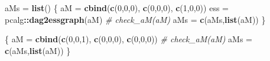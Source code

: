 \documentclass[]{article}
\newenvironment{Shaded}{\begin{snugshade}}{\end{snugshade}}
\newcommand{\KeywordTok}[1]{\textcolor[rgb]{0.13,0.29,0.53}{\textbf{#1}}}
\newcommand{\DecValTok}[1]{\textcolor[rgb]{0.00,0.00,0.81}{#1}}
\newcommand{\StringTok}[1]{\textcolor[rgb]{0.31,0.60,0.02}{#1}}
\newcommand{\CommentTok}[1]{\textcolor[rgb]{0.56,0.35,0.01}{\textit{#1}}}
\newcommand{\OperatorTok}[1]{\textcolor[rgb]{0.81,0.36,0.00}{\textbf{#1}}}
\newcommand{\NormalTok}[1]{#1}
\theoremstyle{definition}
\theoremstyle{definition}
\theoremstyle{definition}
\theoremstyle{remark}
\begin{document}
\begin{Shaded}
\begin{Highlighting}[]
\NormalTok{aMs =}\StringTok{ }\KeywordTok{list}\NormalTok{()}
\NormalTok{\{}
\NormalTok{  aM =}\StringTok{ }\KeywordTok{cbind}\NormalTok{(}\KeywordTok{c}\NormalTok{(}\DecValTok{0}\NormalTok{,}\DecValTok{0}\NormalTok{,}\DecValTok{0}\NormalTok{),}
             \KeywordTok{c}\NormalTok{(}\DecValTok{0}\NormalTok{,}\DecValTok{0}\NormalTok{,}\DecValTok{0}\NormalTok{),}
             \KeywordTok{c}\NormalTok{(}\DecValTok{1}\NormalTok{,}\DecValTok{0}\NormalTok{,}\DecValTok{0}\NormalTok{))}
\NormalTok{  ess =}\StringTok{ }\NormalTok{pcalg}\OperatorTok{::}\KeywordTok{dag2essgraph}\NormalTok{(aM)}
  \CommentTok{# check_aM(aM)}
\NormalTok{  aMs =}\StringTok{ }\KeywordTok{c}\NormalTok{(aMs,}\KeywordTok{list}\NormalTok{(aM))}
\NormalTok{\}}

\NormalTok{\{}
\NormalTok{  aM =}\StringTok{ }\KeywordTok{cbind}\NormalTok{(}\KeywordTok{c}\NormalTok{(}\DecValTok{0}\NormalTok{,}\DecValTok{0}\NormalTok{,}\DecValTok{1}\NormalTok{),}
             \KeywordTok{c}\NormalTok{(}\DecValTok{0}\NormalTok{,}\DecValTok{0}\NormalTok{,}\DecValTok{0}\NormalTok{),}
             \KeywordTok{c}\NormalTok{(}\DecValTok{0}\NormalTok{,}\DecValTok{0}\NormalTok{,}\DecValTok{0}\NormalTok{))}
  \CommentTok{# check_aM(aM)}
\NormalTok{  aMs =}\StringTok{ }\KeywordTok{c}\NormalTok{(aMs,}\KeywordTok{list}\NormalTok{(aM))}
\NormalTok{\}}
\end{Highlighting}
\end{Shaded}
\end{document}
